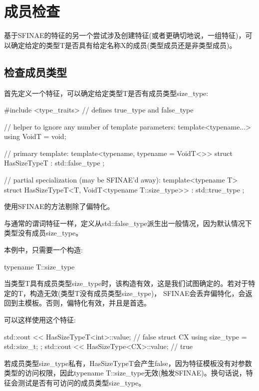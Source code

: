 \section{成员检查}

基于SFINAE的特征的另一个尝试涉及创建特征(或者更确切地说，一组特征)，可以确定给定的类型T是否具有给定名称X的成员(类型成员还是非类型成员)。

\subsection{检查成员类型}

首先定义一个特征，可以确定给定类型T是否有成员类型size\_type:

\begin{cpp}
#include <type_traits> // defines true_type and false_type

// helper to ignore any number of template parameters:
template<typename...> using VoidT = void;

// primary template:
template<typename, typename = VoidT<>>
struct HasSizeTypeT : std::false_type
{
};

// partial specialization (may be SFINAE'd away):
template<typename T>
struct HasSizeTypeT<T, VoidT<typename T::size_type>> : std::true_type
{
};
\end{cpp}

使用SFINAE的方法剔除了偏特化。

与通常的谓词特征一样，定义从std::false\_type派生出一般情况，因为默认情况下类型没有成员size\_type。

本例中，只需要一个构造:

\begin{cpp}
typename T::size_type
\end{cpp}

当类型T具有成员类型size\_type时，该构造有效，这是我们试图确定的。若对于特定的T，构造无效(类型T没有成员类型size\_type)， SFINAE会丢弃偏特化，会返回到主模板。否则，偏特化有效，并且是首选。

可以这样使用这个特征:

\begin{cpp}
std::cout << HasSizeTypeT<int>::value; // false
struct CX {
	using size_type = std::size_t;
};
std::cout << HasSizeType<CX>::value; // true
\end{cpp}

若成员类型size\_type私有，HasSizeTypeT会产生false，因为特征模板没有对参数类型的访问权限，因此typename T::size\_type无效(触发SFINAE)。换句话说，特征会测试是否有可访问的成员类型size\_type。

